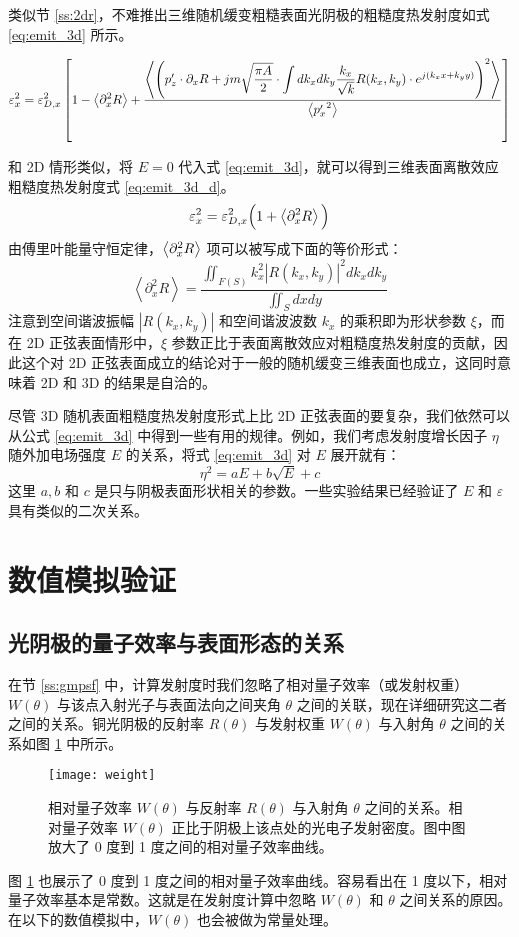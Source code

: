 类似节 \ref{ss:2dr}，不难推出三维随机缓变粗糙表面光阴极的粗糙度热发射度如式 \ref{eq:emit_3d} 所示。

\begin{equation}
\varepsilon_x^2 = \varepsilon_{D, x}^2\left[1-\left\langle{\partial_x^2R}\right\rangle+\dfrac{\left\langle{\left(p_z^{\prime}\cdot\partial_xR+jm\sqrt{\dfrac{\pi A}{2}}\displaystyle\cdot\int dk_xdk_y\dfrac{k_x}{\sqrt{k}}R(k_x, k_y)\cdot e^{j(k_xx+k_yy)}\right)^2}\right\rangle}{\left\langle{{p_x^{\prime}}^2}\right\rangle}\right]
\label{eq:emit_3d}
\end{equation}

和 2D 情形类似，将 $E = 0$ 代入式 \ref{eq:emit_3d}，就可以得到三维表面离散效应粗糙度热发射度式 \ref{eq:emit_3d_d}。
\begin{equation}
\varepsilon_x^2 = \varepsilon_{D, x}^2\Big(1+\left\langle{\partial_x^2R}\right\rangle\Big)
\label{eq:emit_3d_d}
\end{equation}
由傅里叶能量守恒定律，$\left\langle{\partial_x^2R}\right\rangle$ 项可以被写成下面的等价形式：
\[
\left\langle \partial_x^2 R \right\rangle = \dfrac{\displaystyle\iint_{F(S)} k_x^2\left|R(k_x, k_y)\right|^2dk_xdk_y}{\displaystyle\iint_{S} dxdy}
\]
注意到空间谐波振幅 $|R(k_x, k_y)|$ 和空间谐波波数 $k_x$ 的乘积即为形状参数 $\xi$，而在 2D 正弦表面情形中，$\xi$ 参数正比于表面离散效应对粗糙度热发射度的贡献，因此这个对 2D 正弦表面成立的结论对于一般的随机缓变三维表面也成立，这同时意味着 2D 和 3D 的结果是自洽的。

尽管 3D 随机表面粗糙度热发射度形式上比 2D 正弦表面的要复杂，我们依然可以从公式 \ref{eq:emit_3d} 中得到一些有用的规律。例如，我们考虑发射度增长因子 $\eta$ 随外加电场强度 $E$ 的关系，将式 \ref{eq:emit_3d} 对 $E$ 展开就有：
\[
\eta^2 = aE+b\sqrt{E}+c
\]
这里 $a, b$ 和 $c$ 是只与阴极表面形状相关的参数。一些实验结果已经验证了 $E$ 和 $\varepsilon$ 具有类似的二次关系。

\section{\label{s:num}数值模拟验证}
\subsection{光阴极的量子效率与表面形态的关系}
在节 \ref{ss:gmpsf} 中，计算发射度时我们忽略了相对量子效率（或发射权重） $W(\theta)$ 与该点入射光子与表面法向之间夹角 $\theta$ 之间的关联，现在详细研究这二者之间的关系。铜光阴极的反射率 $R(\theta)$ 与发射权重 $W(\theta)$ 与入射角 $\theta$ 之间的关系如图 \ref{fig:weight} 中所示。
\begin{figure}[htbp]
\centering
\texttt{[image: weight]}
\caption{\label{fig:weight} 相对量子效率 $W(\theta)$ 与反射率 $R(\theta)$ 与入射角 $\theta$ 之间的关系。相对量子效率 $W(\theta)$ 正比于阴极上该点处的光电子发射密度。图中图放大了 0 度到 1 度之间的相对量子效率曲线。}
\end{figure}
图 \ref{fig:weight} 也展示了 0 度到 1 度之间的相对量子效率曲线。容易看出在 1 度以下，相对量子效率基本是常数。这就是在发射度计算中忽略 $W(\theta)$ 和 $\theta$ 之间关系的原因。在以下的数值模拟中，$W(\theta)$ 也会被做为常量处理。

